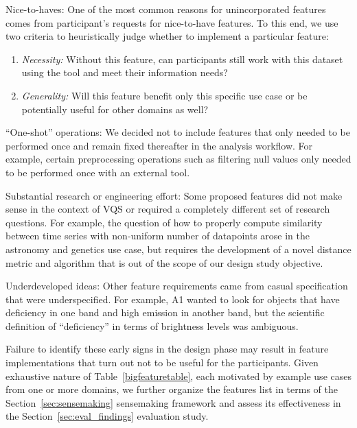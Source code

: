 {  \begin{denselist} %
  \item Nice-to-haves: One of the most common reasons for unincorporated features comes from participant's requests for nice-to-have features. To this end, we use two criteria to heuristically judge whether to implement a particular feature:
  \begin{enumerate}[leftmargin=*]
  \item \textit{Necessity:} Without this feature, can participants still work with this dataset using the tool and meet their information needs?
  \item \textit{Generality:} Will this feature benefit only this specific use case or be potentially useful for other domains as well?
  \end{enumerate}
  \item ``One-shot'' operations: We decided not to include features that only needed to be performed once and remain fixed thereafter in the analysis workflow. For example, certain preprocessing operations such as filtering null values only needed to be performed once with an external tool.
  \item Substantial research or engineering effort: Some proposed features did not make sense in the context of VQS or required a completely different set of research questions. For example, the question of how to properly compute similarity between time series with non-uniform number of datapoints arose in the astronomy and genetics use case, but requires the development of a novel distance metric and algorithm that is out of the scope of our design study objective. %
  \item Underdeveloped ideas: Other feature requirements came from casual specification that were underspecified. For example, A1 wanted to look for objects that have deficiency in one band and high emission in another band, but the scientific definition of ``deficiency'' in terms of brightness levels was ambiguous.
  \end{denselist}
  \par Failure to identify these early signs in the design phase may result in feature implementations that turn out not to be useful for the participants. Given exhaustive nature of Table~\ref{bigfeaturetable}, each motivated by example use cases from one or more domains, we further organize the features list in terms of the Section~\ref{sec:sensemaking} sensemaking framework and assess its effectiveness in the Section~\ref{sec:eval_findings} evaluation study.
}
